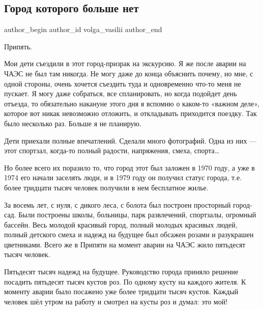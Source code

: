  
 
 
 
 
 
\subsection{Город которого больше нет}
\label{sec:19_11_2020.fb.volga_vasilii.1.gorod_pripjat}
\ifcmt
	author_begin
   author_id volga_vasilii
	author_end
\fi


Припять. 

Мои дети съездили в этот город-призрак на экскурсию. Я же после аварии на ЧАЭС
не был там никогда. Не могу даже до конца объяснить почему, но мне, с одной
стороны, очень хочется съездить туда и одновременно что-то меня не пускает. Я
могу даже собраться, все спланировать, но когда подойдет день отъезда, то
обязательно накануне этого дня я вспомню о каком-то «важном деле», которое вот
никак невозможно отложить, и откладывать приходится поездку. Так было несколько
раз. Больше я не планирую. 

Дети приехали полные впечатлений. Сделали много фотографий. Одна из них --- этот
спортзал, когда-то полный радости, напряжения, смеха, спорта… 

Но более всего их поразило то, что город этот был заложен в 1970 году, а уже в
1974 его начали заселять люди, и в 1979 году он получил статус города, т.е.
более тридцати тысяч человек получили в нем бесплатное жилье. 

За восемь лет, с нуля, с дикого леса, с болота был построен просторный
город-сад. Были построены школы, больницы, парк развлечений, спортзалы,
огромный бассейн. Весь молодой красивый город, полный молодых красивых людей,
полный детского смеха и надежд на будущее был обсажен розами и разукрашен
цветниками. Всего же в Припяти на момент аварии на ЧАЭС жило пятьдесят тысяч
человек. 

Пятьдесят тысяч надежд на будущее. Руководство города приняло решение посадить
пятьдесят тысяч кустов роз. По одному кусту на каждого жителя. К моменту аварии
было посажено уже более тридцати тысяч кустов. Каждый человек шёл утром на
работу и смотрел на кусты роз и думал: это мой!

